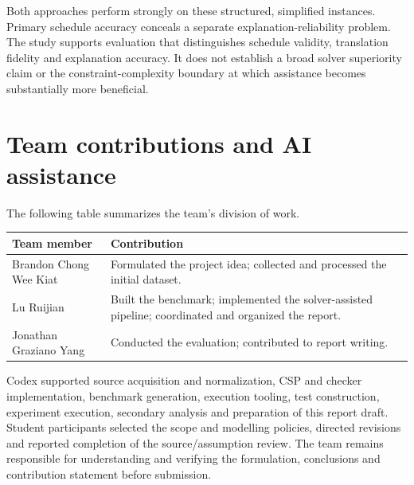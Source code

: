 \documentclass[11pt,a4paper]{article}
\begin{document}
Both approaches perform strongly on these structured, simplified instances.
Primary schedule accuracy
conceals a separate explanation-reliability problem. The study supports
evaluation that distinguishes schedule validity, translation fidelity and
explanation accuracy. It does not establish a broad solver superiority
claim or the constraint-complexity boundary at which assistance becomes
substantially more beneficial.

\section{Team contributions and AI assistance}
The following table summarizes the team's division of work.
\begin{center}
\begin{minipage}{\linewidth}
\begin{tabularx}{\linewidth}{@{}lY@{}}
\toprule
Team member & Contribution\\
\midrule
Brandon Chong Wee Kiat & Formulated the project idea; collected and processed the initial dataset.\\
Lu Ruijian & Built the benchmark; implemented the solver-assisted pipeline; coordinated and organized the report.\\
Jonathan Graziano Yang & Conducted the evaluation; contributed to report writing.\\
\bottomrule
\end{tabularx}
\end{minipage}
\end{center}
Codex supported source acquisition and normalization, CSP and checker
implementation, benchmark generation, execution tooling, test construction,
experiment execution, secondary analysis and preparation of this report
draft. Student participants selected the scope and modelling policies,
directed revisions and reported completion of the source/assumption review.
The team remains responsible for understanding and verifying the
formulation, conclusions and contribution statement before submission.
\end{document}
